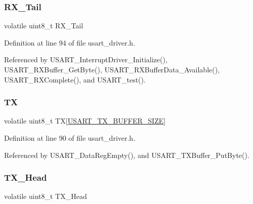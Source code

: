 \hypertarget{struct_u_s_a_r_t___buffer_acbe55e05936cb836303c2fd41ec2d734}{}\label{struct_u_s_a_r_t___buffer_acbe55e05936cb836303c2fd41ec2d734} 
\subsubsection{\texorpdfstring{R\+X\+\_\+\+Tail}{RX\_Tail}}
{\footnotesize\ttfamily volatile uint8\+\_\+t R\+X\+\_\+\+Tail}



Definition at line 94 of file usart\+\_\+driver.\+h.



Referenced by U\+S\+A\+R\+T\+\_\+\+Interrupt\+Driver\+\_\+\+Initialize(), U\+S\+A\+R\+T\+\_\+\+R\+X\+Buffer\+\_\+\+Get\+Byte(), U\+S\+A\+R\+T\+\_\+\+R\+X\+Buffer\+Data\+\_\+\+Available(), U\+S\+A\+R\+T\+\_\+\+R\+X\+Complete(), and U\+S\+A\+R\+T\+\_\+test().

\hypertarget{struct_u_s_a_r_t___buffer_a392312bfc5a33886fa4c6999cea21ecc}{}\label{struct_u_s_a_r_t___buffer_a392312bfc5a33886fa4c6999cea21ecc} 
\subsubsection{\texorpdfstring{TX}{TX}}
{\footnotesize\ttfamily volatile uint8\+\_\+t TX\mbox{[}\hyperlink{usart__driver_8h_a21d527450b438bba8dab02e03f021ee3}{U\+S\+A\+R\+T\+\_\+\+T\+X\+\_\+\+B\+U\+F\+F\+E\+R\+\_\+\+S\+I\+ZE}\mbox{]}}



Definition at line 90 of file usart\+\_\+driver.\+h.



Referenced by U\+S\+A\+R\+T\+\_\+\+Data\+Reg\+Empty(), and U\+S\+A\+R\+T\+\_\+\+T\+X\+Buffer\+\_\+\+Put\+Byte().

\hypertarget{struct_u_s_a_r_t___buffer_ae18341a2700d746f90841b29ce8b05ca}{}\label{struct_u_s_a_r_t___buffer_ae18341a2700d746f90841b29ce8b05ca} 
\subsubsection{\texorpdfstring{T\+X\+\_\+\+Head}{TX\_Head}}
{\footnotesize\ttfamily volatile uint8\+\_\+t T\+X\+\_\+\+Head}



